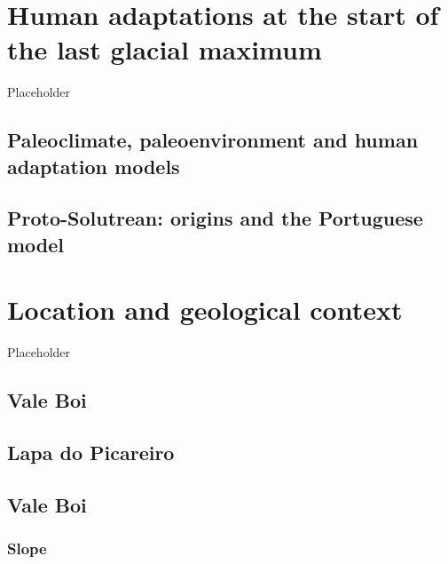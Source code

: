 \documentclass[12pt,twoside]{reedthesis}
\begin{document}
\hypertarget{human-adaptations-at-the-start-of-the-last-glacial-maximum}{%
\chapter{Human adaptations at the start of the last glacial maximum}\label{human-adaptations-at-the-start-of-the-last-glacial-maximum}}

Placeholder

\hypertarget{paleoclimate-paleoenvironment-and-human-adaptation-models}{%
\section{Paleoclimate, paleoenvironment and human adaptation models}\label{paleoclimate-paleoenvironment-and-human-adaptation-models}}

\hypertarget{proto-solutrean-origins-and-the-portuguese-model}{%
\section{Proto-Solutrean: origins and the Portuguese model}\label{proto-solutrean-origins-and-the-portuguese-model}}

\hypertarget{location-and-geological-context}{%
\chapter{Location and geological context}\label{location-and-geological-context}}

Placeholder

\hypertarget{vale-boi}{%
\section{Vale Boi}\label{vale-boi}}

\hypertarget{lapa-do-picareiro}{%
\section{Lapa do Picareiro}\label{lapa-do-picareiro}}

\hypertarget{vale-boi-1}{%
\section{Vale Boi}\label{vale-boi-1}}

\hypertarget{slope}{%
\subsection{Slope}\label{slope}}
\end{document}
